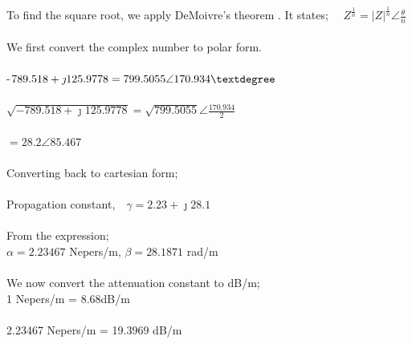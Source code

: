 \begin{exmp}
To find the square root, we apply DeMoivre's theorem \footnotemark[3]. It states; $ \quad Z^{\frac{1}{n}} = |Z|^{\frac{1}{n}}\angle\frac{\theta}{n} $\\\\
We first convert the complex number to polar form.\\\\
-$ 789.518 + \jmath 125.9778 = 799.5055\angle 170.934\textdegree $\\\\
$ \sqrt{-789.518 + \jmath 125.9778} = \sqrt{799.5055}\angle \frac{170.934}{2} $\\\\
$ =28.2\angle 85.467 $\\\\
Converting back to cartesian form; \\\\
Propagation constant,$\quad\gamma=2.23 +\jmath 28.1 $\\\\
From the expression; \\
$ \alpha = 2.23467 $ Nepers/m, $ \beta = 28.1871 $ rad/m\\\\
We now convert the attenuation constant to dB/m; \\
1 Nepers/m = 8.68dB/m \\\\
2.23467 Nepers/m = 19.3969 dB/m
\end{exmp} 

